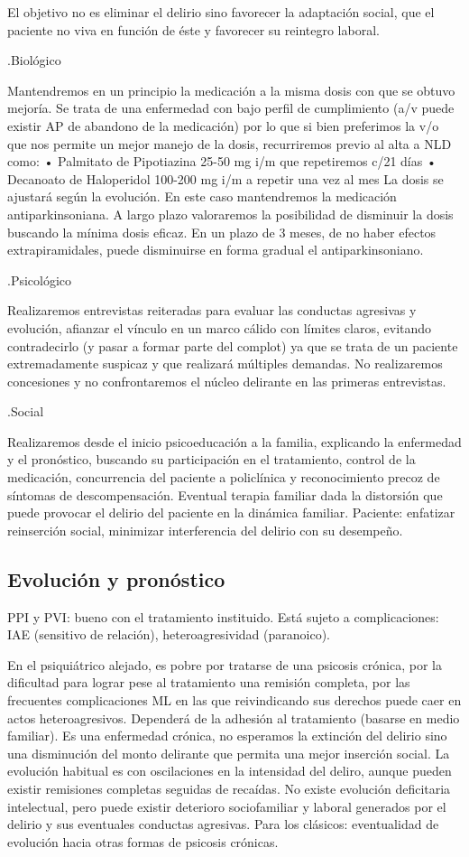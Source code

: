 \documentclass{scrbook}
\begin{document}
El objetivo no es eliminar el delirio sino favorecer la adaptación social, que el paciente no viva en función de éste y favorecer su reintegro laboral.

.Biológico

Mantendremos en un principio la medicación a la misma dosis con que se obtuvo mejoría. Se trata de una enfermedad con bajo perfil de cumplimiento (a/v puede existir AP de abandono de la medicación) por lo que si bien preferimos la v/o que nos permite un mejor manejo de la dosis, recurriremos previo al alta a NLD como: • Palmitato de Pipotiazina 25-50 mg i/m que repetiremos c/21 días • Decanoato de Haloperidol 100-200 mg i/m a repetir una vez al mes La dosis se ajustará según la evolución. En este caso mantendremos la medicación antiparkinsoniana. A largo plazo valoraremos la posibilidad de disminuir la dosis buscando la mínima dosis eficaz. En un plazo de 3 meses, de no haber efectos extrapiramidales, puede disminuirse en forma gradual el antiparkinsoniano.

.Psicológico

Realizaremos entrevistas reiteradas para evaluar las conductas agresivas y evolución, afianzar el vínculo en un marco cálido con límites claros, evitando contradecirlo (y pasar a formar parte del complot) ya que se trata de un paciente extremadamente suspicaz y que realizará múltiples demandas. No realizaremos concesiones y no confrontaremos el núcleo delirante en las primeras entrevistas.

.Social

Realizaremos desde el inicio psicoeducación a la familia, explicando la enfermedad y el pronóstico, buscando su participación en el tratamiento, control de la medicación, concurrencia del paciente a policlínica y reconocimiento precoz de síntomas de descompensación. Eventual terapia familiar dada la distorsión que puede provocar el delirio del paciente en la dinámica familiar. Paciente: enfatizar reinserción social, minimizar interferencia del delirio con su desempeño.
\subsection*{Evolución y pronóstico}
PPI y PVI: bueno con el tratamiento instituido. Está sujeto a complicaciones: IAE (sensitivo de relación), heteroagresividad (paranoico).

En el psiquiátrico alejado, es pobre por tratarse de una psicosis crónica, por la dificultad para lograr pese al tratamiento una remisión completa, por las frecuentes complicaciones ML en las que reivindicando sus derechos puede caer en actos heteroagresivos. Dependerá de la adhesión al tratamiento (basarse en medio familiar). Es una enfermedad crónica, no esperamos la extinción del delirio sino una disminución del monto delirante que permita una mejor inserción social. La evolución habitual es con oscilaciones en la intensidad del deliro, aunque pueden existir remisiones completas seguidas de recaídas. No existe evolución deficitaria intelectual, pero puede existir deterioro sociofamiliar y laboral generados por el delirio y sus eventuales conductas agresivas. Para los clásicos: eventualidad de evolución hacia otras formas de psicosis crónicas.
\end{document}
